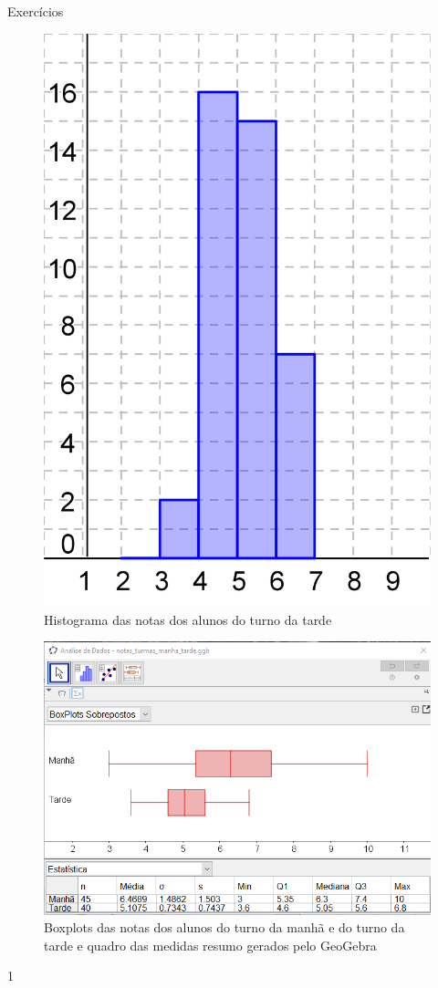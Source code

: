 \begin{answer}{Exercícios}
{\begin{multicols}{2}
\begin{figure}[H]
  \includegraphics[width=.6\linewidth]{histograma_turma_tarde_1.png}
  \caption{Histograma das notas dos alunos do turno da tarde}
  \label{}
  \end{figure}
\end{multicols}
  \begin{figure}[H]
  \centering
  
  \includegraphics[width=.5\linewidth]{notas_turmas_manha_tarde.png}
   \caption{Boxplots das notas dos alunos do turno da manhã e do turno da tarde e quadro das medidas resumo gerados pelo GeoGebra}
  \label{}
  \end{figure}
}{1}
\end{answer}
